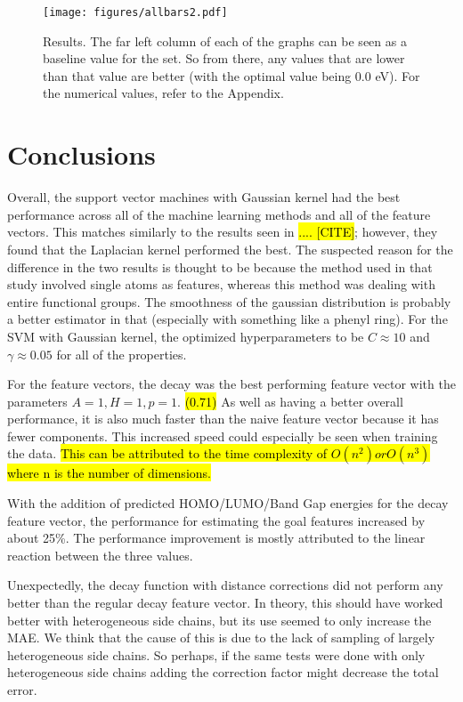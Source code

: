 \documentclass[10pt]{article}
\begin{document}
 \begin{figure}[H]
   \begin{center}
     \texttt{[image: figures/allbars2.pdf]}
   \end{center}
   \caption{Results. The far left column of each of the graphs can be seen as a baseline value for the set. So from there, any values that are lower than that value are better (with the optimal value being 0.0 eV). For the numerical values, refer to the Appendix.}
   \label{fig:results}
 \end{figure}

\section{Conclusions}

Overall, the support vector machines with Gaussian kernel had the best performance across all of the machine learning methods and all of the feature vectors. This matches similarly to the results seen in \hl{.... [CITE]}; however, they found that the Laplacian kernel performed the best. The suspected reason for the difference in the two results is thought to be because the method used in that study involved single atoms as features, whereas this method was dealing with entire functional groups. The smoothness of the gaussian distribution is probably a better estimator in that (especially with something like a phenyl ring). For the SVM with Gaussian kernel, the optimized hyperparameters to be $C \approx 10$ and $\gamma \approx 0.05$ for all of the properties.

For the feature vectors, the decay was the best performing feature vector with the parameters $A = 1, H = 1, p = 1$. \hl{(0.71)} As well as having a better overall performance, it is also much faster than the naive feature vector because it has fewer components. This increased speed could especially be seen when training the data. \hl{This can be attributed to the time complexity of $O(n^2) or O(n^3)$ where n is the number of dimensions.}

With the addition of predicted HOMO/LUMO/Band Gap energies for the decay feature vector, the performance for estimating the goal features increased by about 25\%. The performance improvement is mostly attributed to the linear reaction between the three values.

Unexpectedly, the decay function with distance corrections did not perform any better than the regular decay feature vector. In theory, this should have worked better with heterogeneous side chains, but its use seemed to only increase the MAE. We think that the cause of this is due to the lack of sampling of largely heterogeneous side chains. So perhaps, if the same tests were done with only heterogeneous side chains adding the correction factor might decrease the total error.
\end{document}
